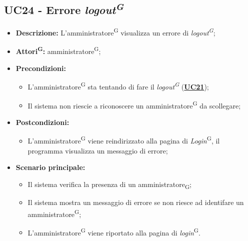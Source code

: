 \subsection{UC24 - Errore \textit{logout\textsuperscript{G}}}
\label{sec:UC24}
\begin{itemize}
	\item \textbf{Descrizione:} L’amministratore\textsuperscript{G} visualizza un errore di \textit{logout\textsuperscript{G}};
	\item \textbf{Attori\textsuperscript{G}:} amministratore\textsuperscript{G};
	\item \textbf{Precondizioni:} 
	\begin{itemize}
		\item L’amministratore\textsuperscript{G} sta tentando di fare il \textit{logout\textsuperscript{G}} (\hyperref[sec:UC21]{\textbf{UC21}});
		\item Il sistema non riescie a riconoscere un amministratore\textsuperscript{G} da scollegare;
	\end{itemize}
	\item \textbf{Postcondizioni:} 
	\begin{itemize}
		\item L'amministratore\textsuperscript{G} viene reindirizzato alla pagina di \textit{Login}\textsuperscript{G}, il programma visualizza un messaggio di errore;
	\end{itemize}
	\item \textbf{Scenario principale:} 
	\begin{itemize}
		\item Il sistema verifica la presenza di un amministratore\textsubscript{G};
		\item Il sistema mostra un messaggio di errore se non riesce ad identifare un amministratore\textsuperscript{G};
		\item L'amministratore\textsuperscript{G} viene riportato alla pagina di \textit{login}\textsuperscript{G}.
	\end{itemize}
\end{itemize}

